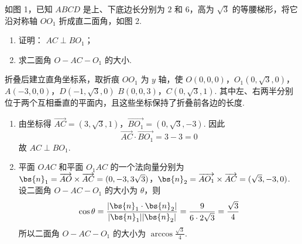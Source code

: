 \begin{problem}
如图 1，已知 \(ABCD\) 是上、下底边长分别为 \(2\) 和 \(6\)，高为 \(\sqrt{3}\) 的等腰梯形，将它沿对称轴 \(OO_{1}\) 折成直二面角，如图 2.

\begin{enumerate}
\item 证明： \(AC \perp BO_{1}\)；
\item 求二面角 \(O - AC - O_{1}\) 的大小.
\end{enumerate}


\begin{solution}
折叠后建立直角坐标系，取折痕 \(OO_1\) 为 \(y\) 轴，使
\(O(0,0,0)\)，\(O_1(0,\sqrt{3},0)\)，\(A(-3,0,0)\)，\(D(-1,\sqrt{3},0)\)
\(B(0,0,3)\)，\(C(0,\sqrt{3},1)\).
其中左、右两半分别位于两个互相垂直的平面内，且这些坐标保持了折叠前各边的长度.

\begin{enumerate}
\item 由坐标得
\(\overrightarrow{AC}=(3,\sqrt{3},1)\)，\(\overrightarrow{BO_1}=(0,\sqrt{3},-3)\).
因此
\[
\overrightarrow{AC}\cdot\overrightarrow{BO_1}=3-3=0
\]
故 \(AC\perp BO_1\).
\item 平面 \(OAC\) 和平面 \(O_1AC\) 的一个法向量分别为
\(\bs{n}_1=\overrightarrow{AO}\times\overrightarrow{AC}=(0,-3,3\sqrt{3})\)，\(\bs{n}_2=\overrightarrow{AO_1}\times\overrightarrow{AC}=(\sqrt{3},-3,0)\).
设二面角 \(O-AC-O_1\) 的大小为 \(\theta\)，则
\[
\cos\theta=\frac{|\bs{n}_1\cdot\bs{n}_2|}{|\bs{n}_1||\bs{n}_2|}
=\frac{9}{6\cdot2\sqrt{3}}=\frac{\sqrt{3}}{4}
\]
所以二面角 \(O-AC-O_1\) 的大小为
\(\arccos\frac{\sqrt{3}}{4}\).
\end{enumerate}
\end{solution}
\end{problem}


